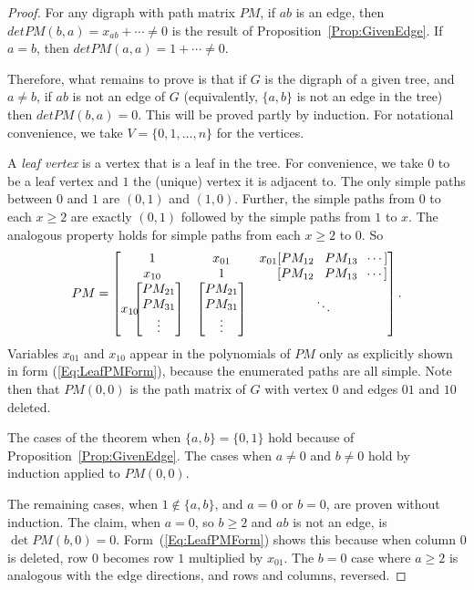 \documentclass[12pt]{article}
\begin{document}
\begin{proof}
  For any digraph with path matrix $PM$, if $ab$ is an edge,
  then $det PM(b,a)= x_{ab} + \cdots \neq 0$ is the result of Proposition~\ref{Prop:GivenEdge}.
  If $a=b$, then $det PM(a,a)= 1 + \cdots \neq 0$.

  Therefore, what remains to prove is that if
  $G$ is the digraph of a given tree, and $a\neq b$,
  if $ab$ is not an edge of $G$ (equivalently, $\{a,b\}$
  is not an edge in the tree) then $det PM(b,a) = 0$.  This will be proved partly by induction. For
  notational convenience, we take $V=\{0, 1, \ldots, n\}$ for the vertices.

  A \emph{leaf vertex} is a vertex that is a leaf in the tree.  For convenience, we take $0$ to
  be a leaf vertex and $1$ the (unique) vertex it is adjacent to.  The only simple paths between
  $0$ and $1$ are $(0,1)$ and $(1,0)$.  Further, the simple paths from $0$ to each $x\geq 2$
  are exactly $(0,1)$ followed by the simple paths from 
  $1$ to $x$.  The analogous property holds for simple paths from each $x\geq 2$ to $0$.
  So
 \begin{equation}\label{Eq:LeafPMForm}
   PM  = \left[
  \begin{matrix}
      1 & x_{01} & x_{01}[PM_{12}\;\;\; PM_{13} \;\; \cdots ] \\
      x_{10} & 1     & \;\;\;\;\; [PM_{12}\;\;\; PM_{13} \;\; \cdots ]\\
      x_{10}\hspace{-2mm}\left[ \begin{matrix}
          PM_{21} \\
          PM_{31} \\
          \vdots
        \end{matrix}
        \right]          &        
           \left[ \begin{matrix}
          PM_{21} \\
          PM_{31} \\
          \vdots
        \end{matrix}
        \right] &    \ddots
    \end{matrix}
  \right].
 \end{equation}
 Variables $x_{01}$ and $x_{10}$ appear in the polynomials of $PM$ only as explicitly shown
 in form (\ref{Eq:LeafPMForm}), because the enumerated paths are all simple.  Note then that
 $PM(0,0)$ is the path matrix of $G$ with vertex $0$ and edges $01$ and $10$ deleted.

 The cases of the theorem when $\{a,b\}=\{0,1\}$ hold because of Proposition~\ref{Prop:GivenEdge}.
   The cases when $a\neq 0$ and $b\neq 0$ hold by induction applied to $PM(0,0)$.

   The remaining cases, when $1\not\in\{a,b\}$, and $a=0$ or $b=0$, are proven without
   induction. The claim, when $a=0$,
   so $b\geq 2$ and $ab$ is not an edge, is $\det PM(b,0)=0$.
   Form~(\ref{Eq:LeafPMForm}) shows this because when column $0$ is deleted, row $0$
   becomes row $1$ multiplied by $x_{01}$. The $b=0$ case where $a\geq 2$ is analogous
   with the edge directions, and rows and columns, reversed.
\end{proof}
\end{document}
